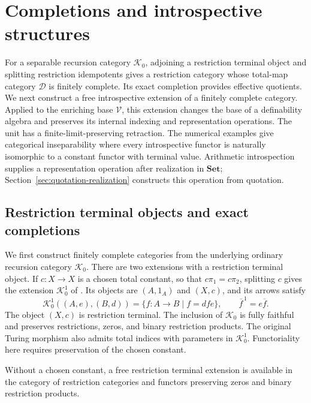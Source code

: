 \documentclass[11pt]{article}
\theoremstyle{definition}
\theoremstyle{remark}
\begin{document}
\section{Completions and introspective structures}
\label{sec:completion-introspection}

For a separable recursion category $\mathcal K_0$, adjoining a
restriction terminal object and splitting restriction idempotents
gives a restriction category whose total-map category $\mathcal D$
is finitely complete. Its exact completion provides effective
quotients. We next construct a free introspective extension of
a finitely complete category. Applied to the enriching base
$\mathscr V$, this extension changes the base of a definability
algebra and preserves its internal indexing and representation
operations. The unit has a finite-limit-preserving retraction.
The numerical examples
give categorical inseparability where every introspective functor
is naturally isomorphic to a constant functor with terminal value.
Arithmetic introspection supplies a representation operation after
realization in $\mathbf{Set}$; Section~\ref{sec:quotation-realization}
constructs this operation from quotation.

\subsection{Restriction terminal objects and exact completions}
\label{sec:completion-comparison}

We first construct finitely complete categories from the underlying
ordinary recursion category $\mathcal K_0$. There are two extensions
with a restriction terminal object. If $c:X\to X$ is a chosen total constant, so that
$c\pi_1=c\pi_2$, splitting $c$ gives the extension $\mathcal K_0^1$
of \cite[Sections~3--4]{RecursionCompletions}. Its objects are
$(A,1_A)$ and $(X,c)$, and its arrows satisfy
\[
 \mathcal K_0^1((A,e),(B,d))
   =\{f:A\to B\mid f=dfe\},
 \qquad \overline f^{\,1}=e\overline f.
\]
The object $(X,c)$ is restriction terminal. The inclusion of
$\mathcal K_0$ is fully faithful and preserves restrictions, zeros,
and binary restriction products. The original Turing morphism
also admits total indices with parameters in $\mathcal K_0^1$.
Functoriality here requires preservation of the chosen constant.

Without a chosen constant, a free restriction terminal extension is available
in the category of restriction categories and functors preserving
zeros and binary restriction products.
\end{document}
